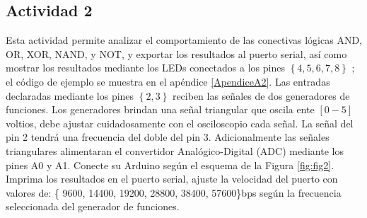 \subsection{Actividad 2}

Esta actividad permite analizar el comportamiento de las conectivas lógicas  AND, OR, XOR, NAND, y NOT, y exportar los resultados al puerto serial, así como mostrar los resultados mediante los LEDs conectados a los pines $\left\lbrace4, 5, 6, 7, 8 \right\rbrace$ ; el código de ejemplo se muestra en el apéndice \ref{ApendiceA2}. Las entradas declaradas mediante los pines $\left\lbrace2, 3 \right\rbrace$ reciben las señales de dos generadores de funciones. Los generadores brindan una señal triangular que oscila ente $[0-5]$ voltios, debe ajustar cuidadosamente con el osciloscopio cada señal. La señal del pin 2 tendrá una frecuencia del doble del pin 3. Adicionalmente las señales  triangulares alimentaran el convertidor Analógico-Digital (ADC) mediante los pines A0 y A1. Conecte su Arduino según el esquema de la Figura \ref{fig:fig2}.  Imprima los resultados en el puerto serial, ajuste la velocidad del puerto con valores de: \{ 9600, 14400, 19200, 28800, 38400, 57600\}bps según la frecuencia seleccionada del generador de funciones.


